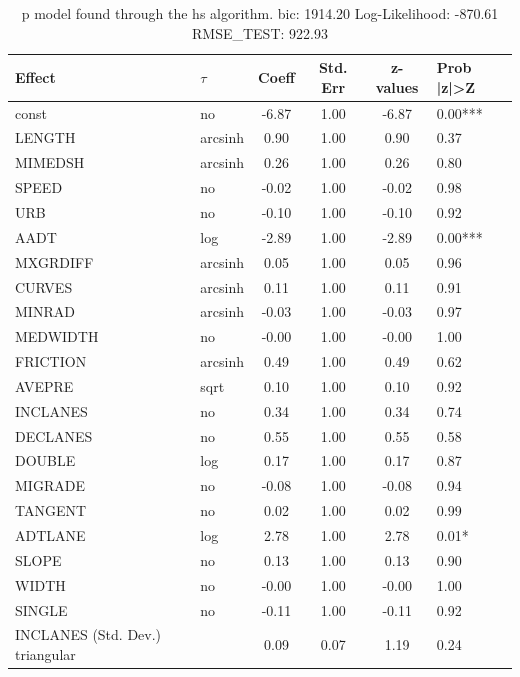 \begin{table}
	\caption{p model found through the hs algorithm. bic: 1914.20 Log-Likelihood: -870.61 RMSE_TEST: 922.93}
	\begin{center}
		\begin{tabular}{|l|l|c|c|c|l|}
			\hline
			Effect & $\tau$ & Coeff & Std. Err & z-values & Prob |z|>Z \\
			\hline
			const & no & -6.87 & 1.00 & -6.87 & 0.00*** \\
			\hline
			LENGTH & arcsinh & 0.90 & 1.00 & 0.90 & 0.37 \\
			\hline
			MIMEDSH & arcsinh & 0.26 & 1.00 & 0.26 & 0.80 \\
			\hline
			SPEED & no & -0.02 & 1.00 & -0.02 & 0.98 \\
			\hline
			URB & no & -0.10 & 1.00 & -0.10 & 0.92 \\
			\hline
			AADT & log & -2.89 & 1.00 & -2.89 & 0.00*** \\
			\hline
			MXGRDIFF & arcsinh & 0.05 & 1.00 & 0.05 & 0.96 \\
			\hline
			CURVES & arcsinh & 0.11 & 1.00 & 0.11 & 0.91 \\
			\hline
			MINRAD & arcsinh & -0.03 & 1.00 & -0.03 & 0.97 \\
			\hline
			MEDWIDTH & no & -0.00 & 1.00 & -0.00 & 1.00 \\
			\hline
			FRICTION & arcsinh & 0.49 & 1.00 & 0.49 & 0.62 \\
			\hline
			AVEPRE & sqrt & 0.10 & 1.00 & 0.10 & 0.92 \\
			\hline
			INCLANES & no & 0.34 & 1.00 & 0.34 & 0.74 \\
			\hline
			DECLANES & no & 0.55 & 1.00 & 0.55 & 0.58 \\
			\hline
			DOUBLE & log & 0.17 & 1.00 & 0.17 & 0.87 \\
			\hline
			MIGRADE & no & -0.08 & 1.00 & -0.08 & 0.94 \\
			\hline
			TANGENT & no & 0.02 & 1.00 & 0.02 & 0.99 \\
			\hline
			ADTLANE & log & 2.78 & 1.00 & 2.78 & 0.01* \\
			\hline
			SLOPE & no & 0.13 & 1.00 & 0.13 & 0.90 \\
			\hline
			WIDTH & no & -0.00 & 1.00 & -0.00 & 1.00 \\
			\hline
			SINGLE & no & -0.11 & 1.00 & -0.11 & 0.92 \\
			\hline
			INCLANES (Std. Dev.) triangular &  & 0.09 & 0.07 & 1.19 & 0.24 \\

\end{tabular}
\end{center}
\end{table}
